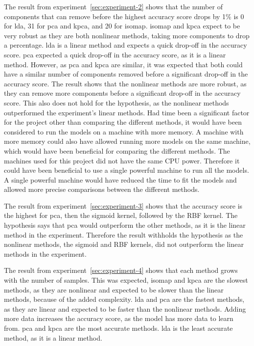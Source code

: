 The result from experiment~\ref{sec:experiment-2} shows that the number of components that can remove before the highest accuracy score drops by 1\% is 0 for \gls{lda}, 31 for \gls{pca} and \gls{kpca}, and 20 for \gls{isomap}. \gls{isomap} and \gls{kpca} expect to be very robust as they are both nonlinear methods, taking more components to drop a percentage. \gls{lda} is a linear method and expects a quick drop-off in the accuracy score. \gls{pca} expected a quick drop-off in the accuracy score, as it is a linear method. However, as \gls{pca} and \gls{kpca} are similar, it was expected that both could have a similar number of components removed before a significant drop-off in the accuracy score. The result shows that the nonlinear methods are more robust, as they can remove more components before a significant drop-off in the accuracy score. This also does not hold for the hypothesis, as the nonlinear methods outperformed the experiment's linear methods. Had time been a significant factor for the project other than comparing the different methods, it would have been considered to run the models on a machine with more memory. A machine with more memory could also have allowed running more models on the same machine, which would have been beneficial for comparing the different methods. The machines used for this project did not have the same CPU power. Therefore it could have been beneficial to use a single powerful machine to run all the models. A single powerful machine would have reduced the time to fit the models and allowed more precise comparisons between the different methods.

The result from experiment~\ref{sec:experiment-3} shows that the accuracy score is the highest for \gls{pca}, then the sigmoid kernel, followed by the RBF kernel. The hypothesis says that \gls{pca} would outperform the other methods, as it is the linear method in the experiment. Therefore the result withholds the hypothesis as the nonlinear methods, the sigmoid and RBF kernels, did not outperform the linear methods in the experiment. 

The result from experiment~\ref{sec:experiment-4} shows that each method grows with the number of samples. This was expected, \gls{isomap} and \gls{kpca} are the slowest methods, as they are nonlinear and expected to be slower than the linear methods, because of the added complexity. \gls{lda} and \gls{pca} are the fastest methods, as they are linear and expected to be faster than the nonlinear methods. Adding more data increases the accuracy score, as the model has more data to learn from. \gls{pca} and \gls{kpca} are the most accurate methods. \gls{lda} is the least accurate method, as it is a linear method.

